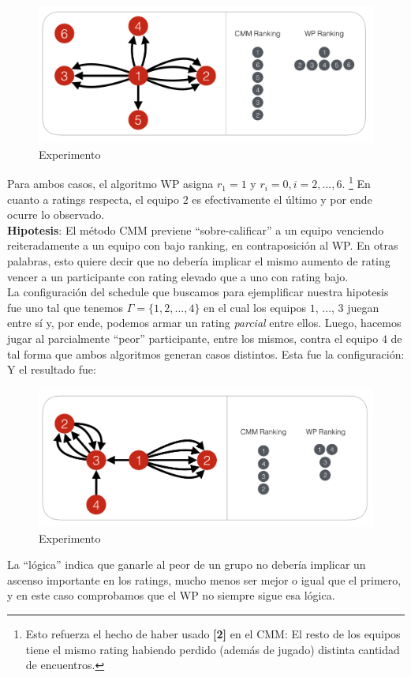 \begin{figure}[h!]
  \begin{center}
	\includegraphics[scale=0.50]{imagenes/cualitative/comparative/comparative2.png}
	\caption{Experimento}
  \end{center}
\end{figure}

Para ambos casos, el algoritmo WP asigna $r_1 = 1$ y $r_i = 0, i = 2, ..., 6$. \footnote{Esto refuerza el hecho de haber usado \textbf{[2]} en el CMM: El resto de los equipos tiene el mismo rating habiendo perdido (además de jugado) distinta cantidad de encuentros.} En cuanto a ratings respecta, el equipo $2$ es efectivamente el \'ultimo y por ende ocurre lo observado. \\

\textbf{Hipotesis}: El m\'etodo CMM previene ``sobre-calificar'' a un equipo venciendo reiteradamente a un equipo con bajo ranking, en contraposici\'on al WP. En otras palabras, esto quiere decir que no deber\'ia implicar el mismo aumento de rating vencer a un participante con rating elevado que a uno con rating bajo. \\

La configuraci\'on del schedule que buscamos para ejemplificar nuestra hipotesis fue uno tal que tenemos $\Gamma = \{1,2,...,4\}$ en el cual los equipos $1$, ..., $3$ juegan entre s\'i y, por ende, podemos armar un rating \textit{parcial} entre ellos. Luego, hacemos jugar al parcialmente ``peor'' participante, entre los mismos, contra el equipo $4$ de tal forma que ambos algoritmos generan casos distintos. Esta fue la configuraci\'on: \\

Y el resultado fue: \\

\begin{figure}[h!]
  \begin{center}
	\includegraphics[scale=0.50]{imagenes/cualitative/comparative/comparative3.png}
	\caption{Experimento}
  \end{center}
\end{figure}


La ``l\'ogica'' indica que ganarle al peor de un grupo no deber\'ia implicar un ascenso importante en los ratings, mucho menos ser mejor o igual que el primero, y en este caso comprobamos que el WP no siempre sigue esa l\'ogica.
